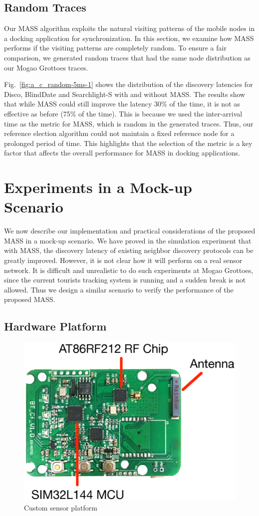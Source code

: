 \documentclass[twoside,twocolumn]{article}
\begin{document}
\subsection{Random Traces}

Our MASS algorithm exploits the natural visiting patterns of the
mobile nodes in a docking application for synchronization.  In this
section, we examine how MASS performs if the visiting patterns are
completely random. To ensure a fair comparison, we generated random
traces that had the same node distribution as our Mogao Grottoes
traces.

Fig.~\ref{fig:a_c_random-5ms-1} shows the distribution of the
discovery latencies for Disco, BlindDate and Searchlight-S with and
without MASS. The results show that while MASS could still improve the
latency 30\% of the time, it is not as effective as before (75\% of
the time).  This is because we used the inter-arrival time as the
metric for MASS, which is random in the generated traces. Thus, our
reference election algorithm could not maintain a fixed reference node
for a prolonged period of time. This highlights that the selection of
the metric is a key factor that affects the overall performance for
MASS in docking applications.

\section{Experiments in a Mock-up Scenario}
\label{sec:mock-up}
We now describe our implementation and practical considerations of the
proposed MASS in a mock-up scenario. We have proved in the simulation 
experiment that with MASS, the discovery latency of existing neighbor 
discovery protocols can be greatly improved. However, it is not clear 
how it will perform on a real sensor network. It is difficult and 
unrealistic to do such experiments at Mogao Grottoes, since the current 
tourists tracking system is running and a sudden break is not allowed.
Thus we design a similar scenario to verify the performance of the 
proposed MASS.

\subsection{Hardware Platform}
\begin{figure}[t]
   \centering
   \includegraphics[width=.7\columnwidth]{static/sensor}
   \caption{Custom sensor platform}
   \label{fig:node}
\end{figure}
\end{document}
